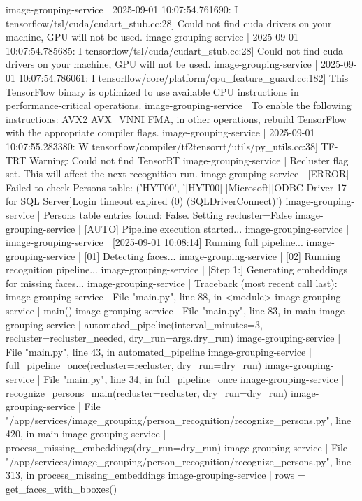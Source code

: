 image-grouping-service  | 2025-09-01 10:07:54.761690: I tensorflow/tsl/cuda/cudart_stub.cc:28] Could not find cuda drivers on your machine, GPU will not be used.
image-grouping-service  | 2025-09-01 10:07:54.785685: I tensorflow/tsl/cuda/cudart_stub.cc:28] Could not find cuda drivers on your machine, GPU will not be used.
image-grouping-service  | 2025-09-01 10:07:54.786061: I tensorflow/core/platform/cpu_feature_guard.cc:182] This TensorFlow binary is optimized to use available CPU instructions in performance-critical operations.
image-grouping-service  | To enable the following instructions: AVX2 AVX_VNNI FMA, in other operations, rebuild TensorFlow with the appropriate compiler flags.
image-grouping-service  | 2025-09-01 10:07:55.283380: W tensorflow/compiler/tf2tensorrt/utils/py_utils.cc:38] TF-TRT Warning: Could not find TensorRT
image-grouping-service  | Recluster flag set. This will affect the next recognition run.
image-grouping-service  | [ERROR] Failed to check Persons table: ('HYT00', '[HYT00] [Microsoft][ODBC Driver 17 for SQL Server]Login timeout expired (0) (SQLDriverConnect)')
image-grouping-service  | Persons table entries found: False. Setting recluster=False
image-grouping-service  | [AUTO] Pipeline execution started...
image-grouping-service  |
image-grouping-service  | [2025-09-01 10:08:14] Running full pipeline...
image-grouping-service  | [01] Detecting faces...
image-grouping-service  | [02] Running recognition pipeline...
image-grouping-service  | [Step 1:] Generating embeddings for missing faces...
image-grouping-service  | Traceback (most recent call last):
image-grouping-service  |   File "main.py", line 88, in <module>
image-grouping-service  |     main()
image-grouping-service  |   File "main.py", line 83, in main
image-grouping-service  |     automated_pipeline(interval_minutes=3, recluster=recluster_needed, dry_run=args.dry_run)
image-grouping-service  |   File "main.py", line 43, in automated_pipeline
image-grouping-service  |     full_pipeline_once(recluster=recluster, dry_run=dry_run)
image-grouping-service  |   File "main.py", line 34, in full_pipeline_once
image-grouping-service  |     recognize_persons_main(recluster=recluster, dry_run=dry_run)
image-grouping-service  |   File "/app/services/image_grouping/person_recognition/recognize_persons.py", line 420, in main
image-grouping-service  |     process_missing_embeddings(dry_run=dry_run)
image-grouping-service  |   File "/app/services/image_grouping/person_recognition/recognize_persons.py", line 313, in process_missing_embeddings
image-grouping-service  |     rows = get_faces_with_bboxes()

